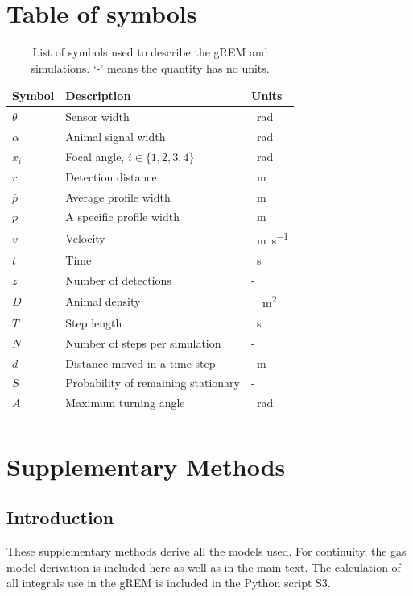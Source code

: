 

\clearpage
\section{Table of symbols}

\begin{table}[h!]
\centering
\begin{tabular}{lll}
Symbol 	& Description & Units\\\hline
$\theta$	& Sensor width & \SI{}{\radian} \\
$\alpha$	& Animal signal width & \SI{}{\radian} \\
$x_i$	        & Focal angle, $i \in \{1,2,3,4\} $ 	& \SI{}{\radian}\\
$r$ 		& Detection distance & \SI{}{\meter}\\
$\bar{p}$ 		& Average profile width & \SI{}{\meter}\\
$p$ 		& A specific profile width & \SI{}{\meter}\\
$v$		& Velocity & \SI{}{\meter\per\second}\\
$t$		& Time & \SI{}{\second}\\
$z$		& Number of detections & -\\
$D$		& Animal density & \SI{}{\per\meter\squared} \\
$T$ 		& Step length & \SI{}{\second}\\
$N$ 		& Number of steps per simulation & -\\
$d$ 		& Distance moved in a time step & \SI{}{\meter}\\
$S$ 		& Probability of remaining stationary & -\\
$A$ 		& Maximum turning angle & \SI{}{\radian}\\
\\
\end{tabular}
\caption{List of symbols used to describe the gREM and simulations. `-' means the quantity has no units.}
\label{t:paras}
\end{table}

\clearpage

\section{Supplementary Methods}
\subsection{Introduction}
These supplementary methods derive all the models used. For continuity, the gas model derivation is included here as well as in the main text. The calculation of all integrals use in the gREM is included in the Python script S3. 




